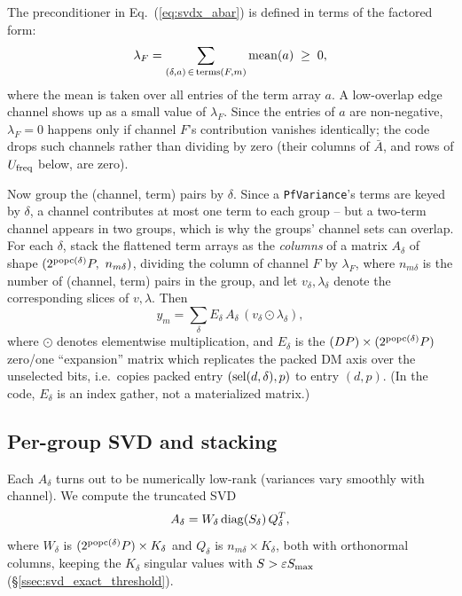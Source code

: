 \documentclass{article}
\numberwithin{equation}{section}   %
\begin{document}
The preconditioner in Eq.\ (\ref{eq:svdx_abar}) is defined in terms of the factored form:
\begin{equation}
\lambda_F = \sum_{(\delta, a) \,\in\, {\rm terms}(F,m)} {\rm mean}(a) \; \ge \; 0,
\label{eq:svdx_lambda}
\end{equation}
where the mean is taken over all entries of the term array $a$. A low-overlap edge channel shows
up as a small value of $\lambda_F$. Since the entries of $a$ are non-negative, $\lambda_F = 0$
happens only if channel $F$'s contribution vanishes identically; the code drops such channels
rather than dividing by zero (their columns of $\bar A$, and rows of $U_{\rm freq}$ below, are
zero).

Now group the (channel, term) pairs by $\delta$. Since a {\tt PfVariance}'s terms are keyed by
$\delta$, a channel contributes at most one term to each group -- but a two-term channel appears
in two groups, which is why the groups' channel sets can overlap. For each $\delta$, stack the
flattened term arrays as the {\em columns} of a matrix $A_\delta$ of shape
$(2^{{\rm popc}(\delta)} P,\ n_{m\delta})$, dividing the column of channel $F$ by $\lambda_F$,
where $n_{m\delta}$ is the number of (channel, term) pairs in the group, and let $v_\delta,
\lambda_\delta$ denote the corresponding slices of $v, \lambda$. Then
\begin{equation}
y_m = \sum_\delta E_\delta \, A_\delta \, (v_\delta \odot \lambda_\delta),
\label{eq:svdx_group_sum}
\end{equation}
where $\odot$ denotes elementwise multiplication, and $E_\delta$ is the
$(DP) \times (2^{{\rm popc}(\delta)} P)$ zero/one ``expansion'' matrix which replicates the
packed DM axis over the unselected bits, i.e.\ copies packed entry $({\rm sel}(d,\delta), p)$ to
entry $(d, p)$. (In the code, $E_\delta$ is an index gather, not a materialized matrix.)

\subsection{Per-group SVD and stacking}
\label{ssec:svd_exact_stacking}

Each $A_\delta$ turns out to be numerically low-rank (variances vary smoothly with channel).
We compute the truncated SVD
\begin{equation}
A_\delta = W_\delta \, {\rm diag}(S_\delta) \, Q_\delta^T,
\end{equation}
where $W_\delta$ is $(2^{{\rm popc}(\delta)}P) \times K_\delta$ and $Q_\delta$ is
$n_{m\delta} \times K_\delta$, both with orthonormal columns, keeping the $K_\delta$ singular
values with $S > \varepsilon S_{\rm max}$ (\S\ref{ssec:svd_exact_threshold}).
\end{document}
